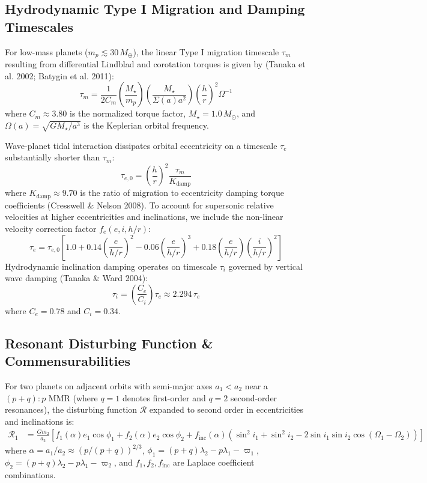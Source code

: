 \documentclass[11pt,a4paper]{article}
\begin{document}
\subsection{Hydrodynamic Type I Migration and Damping Timescales}
For low-mass planets ($m_p \lesssim 30\,M_\oplus$), the linear Type I migration timescale $\tau_m$ resulting from differential Lindblad and corotation torques is given by (Tanaka et al. 2002; Batygin et al. 2011):
\begin{equation}
\tau_m = \frac{1}{2 C_m} \left(\frac{M_\star}{m_p}\right) \left(\frac{M_\star}{\Sigma(a) a^2}\right) \left(\frac{h}{r}\right)^2 \Omega^{-1}
\label{eq:tau_m}
\end{equation}
where $C_m \approx 3.80$ is the normalized torque factor, $M_\star = 1.0\,M_\odot$, and $\Omega(a) = \sqrt{G M_\star / a^3}$ is the Keplerian orbital frequency.

Wave-planet tidal interaction dissipates orbital eccentricity on a timescale $\tau_e$ substantially shorter than $\tau_m$:
\begin{equation}
\tau_{e,0} = \left(\frac{h}{r}\right)^2 \frac{\tau_m}{K_{\text{damp}}}
\label{eq:tau_e0}
\end{equation}
where $K_{\text{damp}} \approx 9.70$ is the ratio of migration to eccentricity damping torque coefficients (Cresswell \& Nelson 2008). To account for supersonic relative velocities at higher eccentricities and inclinations, we include the non-linear velocity correction factor $f_e(e, i, h/r)$:
\begin{equation}
\tau_e = \tau_{e,0} \left[ 1.0 + 0.14 \left(\frac{e}{h/r}\right)^2 - 0.06 \left(\frac{e}{h/r}\right)^3 + 0.18 \left(\frac{e}{h/r}\right) \left(\frac{i}{h/r}\right)^2 \right]
\label{eq:tau_e}
\end{equation}
Hydrodynamic inclination damping operates on timescale $\tau_i$ governed by vertical wave damping (Tanaka \& Ward 2004):
\begin{equation}
\tau_i = \left(\frac{C_e}{C_i}\right) \tau_e \approx 2.294\,\tau_e
\label{eq:tau_i}
\end{equation}
where $C_e = 0.78$ and $C_i = 0.34$.

\subsection{Resonant Disturbing Function \& Commensurabilities}
For two planets on adjacent orbits with semi-major axes $a_1 < a_2$ near a $(p+q):p$ MMR (where $q=1$ denotes first-order and $q=2$ second-order resonances), the disturbing function $\mathcal{R}$ expanded to second order in eccentricities and inclinations is:
\begin{align}
\mathcal{R}_1 &= \frac{G m_2}{a_2} \left[ f_1(\alpha) e_1 \cos\phi_1 + f_2(\alpha) e_2 \cos\phi_2 + f_{\text{inc}}(\alpha) (\sin^2 i_1 + \sin^2 i_2 - 2\sin i_1 \sin i_2 \cos(\Omega_1 - \Omega_2)) \right]
\label{eq:dist_func}
\end{align}
where $\alpha = a_1 / a_2 \approx (p / (p+q))^{2/3}$, $\phi_1 = (p+q)\lambda_2 - p\lambda_1 - \varpi_1$, $\phi_2 = (p+q)\lambda_2 - p\lambda_1 - \varpi_2$, and $f_1, f_2, f_{\text{inc}}$ are Laplace coefficient combinations.
\end{document}
